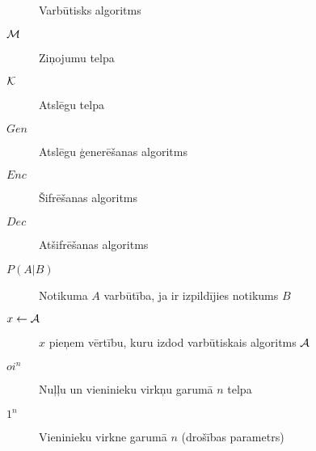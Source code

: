 \begin{description}
    \item[\ppt] Varbūtisks algoritms
    \item[$\mathcal{M}$]Ziņojumu telpa
    \item[$\mathcal{K}$]Atslēgu telpa
    \item[$Gen$]Atslēgu ģenerēšanas algoritms
    \item[$Enc$]Šifrēšanas algoritms
    \item[$Dec$]Atšifrēšanas algoritms
    \item[$P(A|B)$]Notikuma $A$ varbūtība, ja ir izpildījies notikums $B$
    \item[$x \leftarrow \mathcal{A}$]$x$ pieņem vērtību, kuru izdod varbūtiskais algoritms $\mathcal{A}$
    \item[$oi^n$]Nuļļu un vieninieku virkņu garumā $n$ telpa
    \item[$1^n$]Vieninieku virkne garumā $n$ (drošības parametrs)
\end{description}
